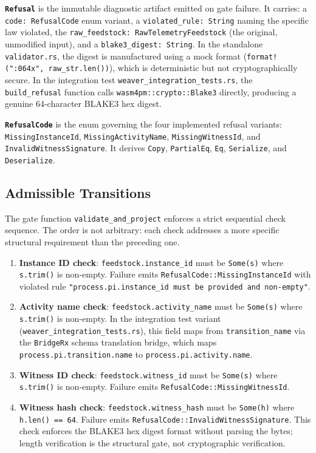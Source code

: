 \textbf{\texttt{Refusal}} is the immutable diagnostic artifact emitted on gate failure.
It carries: a \texttt{code: RefusalCode} enum variant, a \texttt{violated\_rule: String}
naming the specific law violated, the \texttt{raw\_feedstock: RawTelemetryFeedstock}
(the original, unmodified input), and a \texttt{blake3\_digest: String}. In the
standalone \texttt{validator.rs}, the digest is manufactured using a mock format
(\texttt{format!("{:064x}", raw\_str.len())}), which is deterministic but not
cryptographically secure. In the integration test \texttt{weaver\_integration\_tests.rs},
the \texttt{build\_refusal} function calls \texttt{wasm4pm::crypto::Blake3} directly,
producing a genuine 64-character BLAKE3 hex digest.

\textbf{\texttt{RefusalCode}} is the enum governing the four implemented refusal
variants: \texttt{MissingInstanceId}, \texttt{MissingActivityName},
\texttt{MissingWitnessId}, and \texttt{InvalidWitnessSignature}. It derives
\texttt{Copy}, \texttt{PartialEq}, \texttt{Eq}, \texttt{Serialize}, and
\texttt{Deserialize}.

\subsection{Admissible Transitions}
\label{sec:otel-weaver-exp-003-live-check-to-refusal-architecture-transitions}

The gate function \texttt{validate\_and\_project} enforces a strict sequential
check sequence. The order is not arbitrary: each check addresses a more specific
structural requirement than the preceding one.

\begin{enumerate}
  \item \textbf{Instance ID check}: \texttt{feedstock.instance\_id} must be
        \texttt{Some(s)} where \texttt{s.trim()} is non-empty. Failure emits
        \texttt{RefusalCode::MissingInstanceId} with violated rule
        \texttt{"process.pi.instance\_id must be provided and non-empty"}.
  \item \textbf{Activity name check}: \texttt{feedstock.activity\_name} must be
        \texttt{Some(s)} where \texttt{s.trim()} is non-empty. In the integration
        test variant (\texttt{weaver\_integration\_tests.rs}), this field maps from
        \texttt{transition\_name} via the \texttt{BridgeRx} schema translation bridge,
        which maps \texttt{process.pi.transition.name} to
        \texttt{process.pi.activity.name}.
  \item \textbf{Witness ID check}: \texttt{feedstock.witness\_id} must be
        \texttt{Some(s)} where \texttt{s.trim()} is non-empty. Failure emits
        \texttt{RefusalCode::MissingWitnessId}.
  \item \textbf{Witness hash check}: \texttt{feedstock.witness\_hash} must be
        \texttt{Some(h)} where \texttt{h.len() == 64}. Failure emits
        \texttt{RefusalCode::InvalidWitnessSignature}. This check enforces the
        BLAKE3 hex digest format without parsing the bytes; length verification
        is the structural gate, not cryptographic verification.
\end{enumerate}

